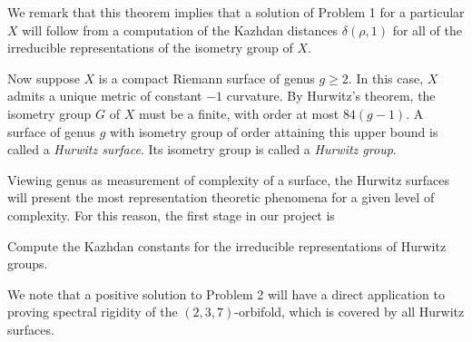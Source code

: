 \documentclass[11pt]{article}
\begin{document}
We remark that this theorem implies that a solution of Problem 1 for a particular $X$ will follow from a computation of the Kazhdan distances $\delta(\rho,1)$ for all of the irreducible representations of the isometry group of $X$.


 Now suppose $X$ is a compact Riemann surface of genus $g\geq 2$. In this case, $X$ admits a unique metric of constant $-1$ curvature. By Hurwitz's theorem, the isometry group $G$ of $X$ must be a finite, with order at most $84(g-1)$. A surface  of genus $g$ with isometry group of order attaining this upper bound is called a \emph{Hurwitz surface}. Its isometry group is called a \emph{Hurwitz group}.
 
 Viewing genus as measurement of complexity of a surface, the Hurwitz surfaces will present the most representation theoretic phenomena for a given level of complexity. For this reason, the first stage in our project is
\begin{problem}
	Compute the Kazhdan constants for the irreducible representations of Hurwitz groups.
\end{problem}
We note that a positive solution to Problem 2 will have a direct application to proving spectral rigidity of the $(2,3,7)$-orbifold, which  is covered by all Hurwitz surfaces.  


{}

\end{document}
